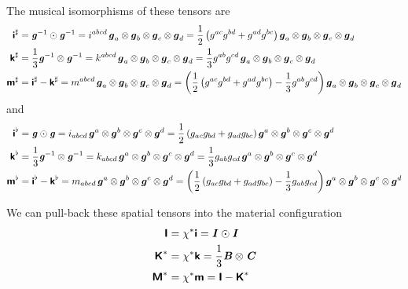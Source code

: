 The musical isomorphisms of these tensors are
\begin{align}
   \boldsymbol{\mathsf{i}}^{\sharp} &=
   {\boldsymbol{\mathit{g}}}^{-1} \odot {\ensuremath{\boldsymbol{\mathit{g}}}}^{-1} =
  i^{abcd}\, \boldsymbol{g}_{a} \otimes \boldsymbol{g}_{b} \otimes \boldsymbol{g}_{c} \otimes \boldsymbol{g}_{d} =
  \dfrac{1}{2}\left( g^{ac}g^{bd}+g^{ad}g^{bc} \right) \boldsymbol{g}_{a} \otimes \boldsymbol{g}_{b} \otimes \boldsymbol{g}_{c} \otimes \boldsymbol{g}_{d} 
  \\
   \boldsymbol{\mathsf{k}}^{\sharp} &=
  \dfrac{1}{3} {\boldsymbol{\mathit{g}}}^{-1} \otimes {\ensuremath{\boldsymbol{\mathit{g}}}}^{-1} =
  k^{abcd}\, \boldsymbol{g}_{a} \otimes \boldsymbol{g}_{b} \otimes \boldsymbol{g}_{c} \otimes \boldsymbol{g}_{d} =
  \dfrac{1}{3}g^{ab}g^{cd}\, \boldsymbol{g}_{a} \otimes \boldsymbol{g}_{b} \otimes \boldsymbol{g}_{c} \otimes \boldsymbol{g}_{d} 
  \\
   \boldsymbol{\mathsf{m}}^{\sharp} &=
   \boldsymbol{\mathsf{i}}^{\sharp} - \boldsymbol{\mathsf{k}}^{\sharp} =
  m^{abcd}\, \boldsymbol{g}_{a} \otimes \boldsymbol{g}_{b} \otimes \boldsymbol{g}_{c} \otimes \boldsymbol{g}_{d} =
  \left( \dfrac{1}{2}\left( g^{ac}g^{bd}+g^{ad}g^{bc} \right)-\dfrac{1}{3}g^{ab}g^{cd} \right) \boldsymbol{g}_{a} \otimes \boldsymbol{g}_{b} \otimes \boldsymbol{g}_{c} \otimes \boldsymbol{g}_{d} 
\end{align}
and
\begin{align}
  \boldsymbol{\mathsf{i}}^{\flat}&=
   \boldsymbol{\mathit{g}} \odot \boldsymbol{\mathit{g}} =
  i_{abcd}\, \boldsymbol{g}^{a} \otimes \boldsymbol{g}^{b} \otimes \boldsymbol{g}^{c} \otimes \boldsymbol{g}^{d} =
  \dfrac{1}{2}\left( g_{ac}g_{bd}+g_{ad}g_{bc} \right) \boldsymbol{g}^{a} \otimes \boldsymbol{g}^{b} \otimes \boldsymbol{g}^{c} \otimes \boldsymbol{g}^{d} 
  \\
  \boldsymbol{\mathsf{k}}^{\flat}&=
  \dfrac{1}{3} {\boldsymbol{\mathit{g}}}^{-1} \otimes {\ensuremath{\boldsymbol{\mathit{g}}}}^{-1} =
  k_{abcd}\, \boldsymbol{g}^{a} \otimes \boldsymbol{g}^{b} \otimes \boldsymbol{g}^{c} \otimes \boldsymbol{g}^{d} =
  \dfrac{1}{3}g_{ab}g_{cd}\, \boldsymbol{g}^{a} \otimes \boldsymbol{g}^{b} \otimes \boldsymbol{g}^{c} \otimes \boldsymbol{g}^{d} 
  \\
  \boldsymbol{\mathsf{m}}^{\flat}&=
  \boldsymbol{\mathsf{i}}^{\flat}-\boldsymbol{\mathsf{k}}^{\flat}=
  m_{abcd}\, \boldsymbol{g}^{a} \otimes \boldsymbol{g}^{b} \otimes \boldsymbol{g}^{c} \otimes \boldsymbol{g}^{d} =
  \left( \dfrac{1}{2}\left( g_{ac}g_{bd}+g_{ad}g_{bc} \right)-\dfrac{1}{3}g_{ab}g_{cd} \right) \boldsymbol{g}^{a} \otimes \boldsymbol{g}^{b} \otimes \boldsymbol{g}^{c} \otimes \boldsymbol{g}^{d} 
\end{align}

We can pull-back these spatial tensors into the material configuration \ie
\begin{align}
  \boldsymbol{\mathsf{I}}&= \chi^{*}\boldsymbol{\mathsf{i}} = \boldsymbol{\mathit{I}} \odot \boldsymbol{\mathit{I}} 
  \\
   \boldsymbol{\mathsf{K}}^{*} &= \chi^{*}\boldsymbol{\mathsf{k}} =\dfrac{1}{3} \boldsymbol{\mathit{B}} \otimes \boldsymbol{\mathit{C}} \\
   \boldsymbol{\mathsf{M}}^{*} &= \chi^{*}\boldsymbol{\mathsf{m}} =\boldsymbol{\mathsf{I}}- \boldsymbol{\mathsf{K}}^{*} 
\end{align}

